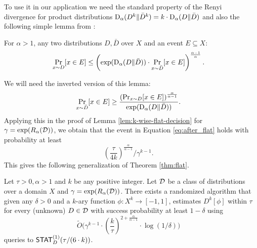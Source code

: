 To use it in our application we need the standard property of the Renyi divergence for product distributions ${\mathrm{D}}_\alpha(D^k\|\bar D^k) = k \cdot {\mathrm{D}}_\alpha(D\|\bar D)$ and also the following simple lemma from \cite[Lemma 1]{MansourMR09}:
\begin{lem}
For $\alpha > 1$, any two distributions $D,\bar D$ over $X$ and an event $E\subseteq X$:
$$\Pr_{x\sim D}[x\in E] \leq \left(\exp({\mathrm{D}}_\alpha(D\|\bar D) ) \cdot \Pr_{x\sim \bar D}[x\in E]\right)^{\frac{\alpha-1}{\alpha}}. $$
\end{lem}
We will need the inverted version of this lemma:
$$\Pr_{x\sim \bar D}[x\in E] \geq \frac{\left(\Pr_{x\sim D}[x\in E]\right)^{\frac{\alpha}{\alpha-1}}}{\exp({\mathrm{D}}_\alpha(D\|\bar D) )}. $$
Applying this in the proof of Lemma \ref{lem:k-wise-flat-decision} for $\gamma = \exp(R_\alpha(\mathcal{D}))$, we obtain that the event in Equation \eqref{eq:after_flat} holds with probability at least $$ \left(\frac{\tau}{4k}\right)^{\frac{\alpha}{\alpha-1}}/ \gamma^{k-1}. $$
This gives the following generalization of Theorem \ref{thm:flat}.
\begin{theorem}\label{thm:flat-approx}
Let $\tau > 0,\alpha >1$ and $k$ be any positive integer. Let $\mathcal{D}$ be a class of distributions over a domain $X$ and $\gamma = \exp(R_\alpha(\mathcal{D}))$. There exists a randomized algorithm that given any $\delta > 0$ and a $k$-ary function $\phi: X^k \to [-1,1]$, estimates $D^k[\phi]$ within $\tau$  for every (unknown) $D \in \mathcal{D}$ with success probability at least $1-\delta$ using $$\tilde{O}\bigg( \gamma^{k-1} \cdot \left( \frac{k}{\tau}\right)^{2+\frac{\alpha}{\alpha-1}} \cdot \log (1/\delta)\bigg)$$
queries to $\mathsf{STAT}_D^{(1)}(\tau/(6 \cdot k))$.\end{theorem}



 